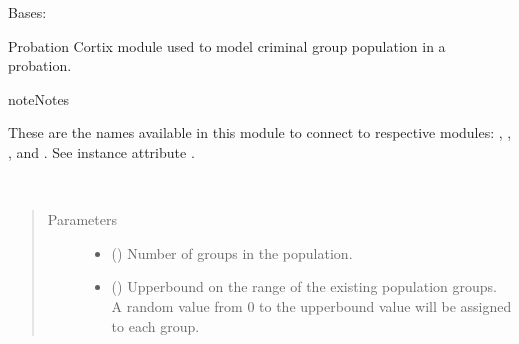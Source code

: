 \documentclass[letterpaper,10pt,openany,oneside,english]{sphinxmanual}
\begin{document}
\begin{fulllineitems}
\label{\detokenize{examples_rst/probation:probation.Probation}}
Bases: 

Probation Cortix module used to model criminal group population in a probation.

\begin{sphinxadmonition}{note}{Notes}

These are the  names available in this module to connect to respective
modules: , , , and .
See instance attribute .
\end{sphinxadmonition}

\begin{fulllineitems}
\label{\detokenize{examples_rst/probation:probation.Probation.__init__}}~\begin{quote}\begin{description}
\item[{Parameters}] \leavevmode\begin{itemize}
\item {} 
 () \textendash{} Number of groups in the population.

\item {} 
 () \textendash{} Upperbound on the range of the existing population groups. A random value
from 0 to the upperbound value will be assigned to each group.

\end{itemize}

\end{description}\end{quote}

\end{fulllineitems}


\end{fulllineitems}
\end{document}
